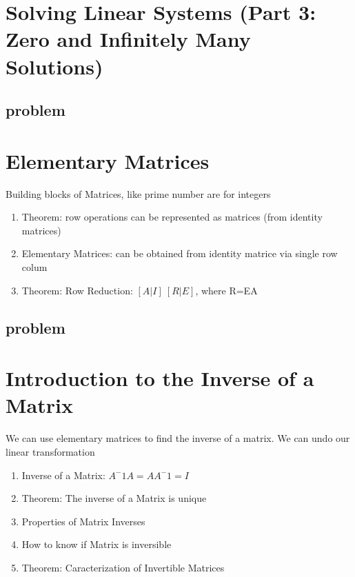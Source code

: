 \documentclass{article}
\begin{document}
\section{Solving Linear Systems (Part 3: Zero and Infinitely Many Solutions)}
\subsection{problem}
\begin{enumerate}
\end{enumerate}

\section{Elementary Matrices}

\begin{intuition}
    Building blocks of Matrices, like prime number are for integers
\end{intuition}

\begin{enumerate}
    \item Theorem: row operations can be represented as matrices (from
	identity matrices)
    \item Elementary Matrices: can be obtained from identity matrice via
	single row colum
    \item Theorem: Row Reduction: $[A|I] ~ [R|E]$, where R=EA
\end{enumerate}

\subsection{problem}
\begin{enumerate}
\end{enumerate}

\section{Introduction to the Inverse of a Matrix}

\begin{intuition}
    We can use elementary matrices to find the inverse of a matrix. We can
    undo our linear transformation
\end{intuition}

\begin{enumerate}
    \item Inverse of a Matrix: $A^-1 A = A A^-1 = I $
    \item Theorem: The inverse of a Matrix is unique
    \item Properties of Matrix Inverses
    \item How to know if Matrix is inversible
    \item Theorem: Caracterization of Invertible Matrices
\end{enumerate}
\end{document}
